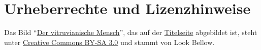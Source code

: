 \documentclass[12pt,a4paper,ngerman,numbers=noenddot,toc=listof]{scrreprt}
\begin{document}
\thispagestyle{empty}

\newpage\printEpigraphPage
{}
\tableofcontents	%
\listoffigures		%
%

\setcounter{headpages}{\value{page}}\newpage{}











\setcounter{sectionsV}{\value{section}}		%
\appendix	%


\section*{Urheberrechte und Lizenzhinweise}
Das Bild \enquote{\href{\URLTitlepageBG}{Der vitruvianische Mensch}},
das auf der \hyperref[titlepage]{Titelseite} abgebildet ist, steht unter
\href{http://creativecommons.org/licenses/by-sa/3.0/deed.de}{Creative Commons BY-SA 3.0}
und stammt von Look Bellow.

\vfill
\printURLlong
\printlicense
\printendsignature
\end{document}
